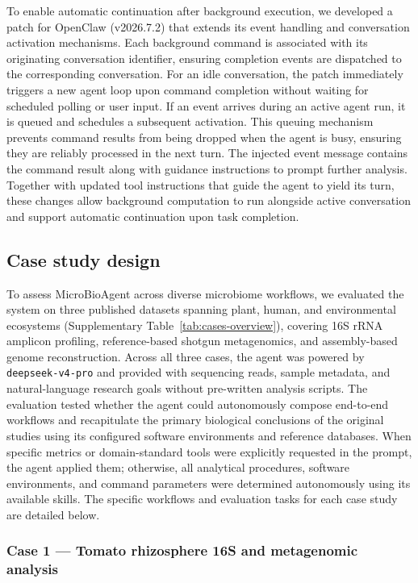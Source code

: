 \documentclass[10pt,letterpaper]{article}
\begin{document}
To enable automatic continuation after background execution, we developed
a patch for OpenClaw (v2026.7.2) that extends its event handling and
conversation activation mechanisms. Each background command is associated
with its originating conversation identifier, ensuring completion events are
dispatched to the corresponding conversation. For an idle conversation,
the patch immediately triggers a new agent loop upon command completion
without waiting for scheduled polling or user input. If an event arrives
during an active agent run, it is queued and schedules a subsequent
activation. This queuing mechanism prevents command results from being
dropped when the agent is busy, ensuring they are reliably processed in
the next turn. The injected event message contains the command result
along with guidance instructions to prompt further analysis. Together
with updated tool instructions that guide the agent to yield its turn,
these changes allow background computation to run alongside active
conversation and support automatic continuation upon task completion.

\subsection{Case study design}
\label{sec:case-design}

To assess MicroBioAgent across diverse microbiome workflows, we evaluated
the system on three published datasets spanning plant, human, and environmental
ecosystems (Supplementary Table~\ref{tab:cases-overview}), covering 16S rRNA
amplicon profiling, reference-based shotgun metagenomics, and assembly-based
genome reconstruction.  Across all three cases, the agent was powered by
\texttt{deepseek-v4-pro} and provided with sequencing reads, sample metadata,
and natural-language research goals without pre-written analysis scripts.
The evaluation tested whether the agent could autonomously compose end-to-end
workflows and recapitulate the primary biological conclusions of the original
studies using its configured software environments and reference databases.
When specific metrics or domain-standard tools were explicitly requested in
the prompt, the agent applied them; otherwise, all analytical procedures,
software environments, and command parameters were determined autonomously
using its available skills.  The specific workflows and evaluation tasks for
each case study are detailed below.

\subsubsection{Case 1 --- Tomato rhizosphere 16S and metagenomic analysis}
\label{sec:methods-tomato}
\end{document}
